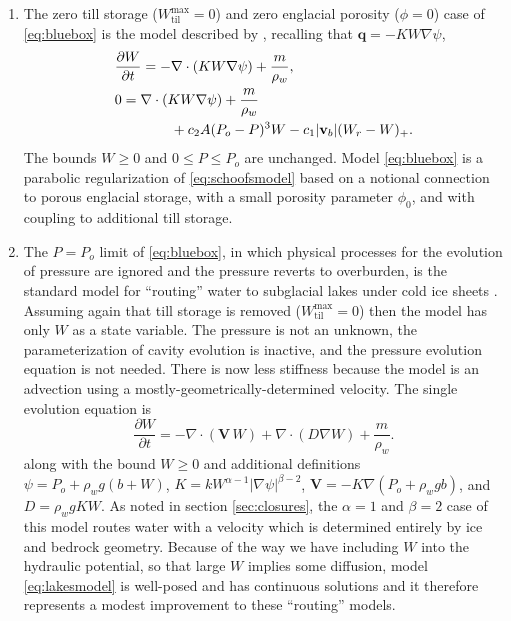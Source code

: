 \documentclass[gmd]{copernicus}   %
\newcommand{\text}{\textrm}
\newcommand\bv{\mathbf{v}}
\newcommand\bV{\mathbf{V}}
\newcommand\bq{\mathbf{q}}
\newcommand{\Div}{\nabla\cdot}
\newcommand{\grad}{\nabla}
\newcommand{\Wtilmax}{W_{\text{til}}^{\text{max}}}
\begin{document}
\renewcommand{\labelenumi}{\textbf{(\roman{enumi})}}
\begin{enumerate}
\item The zero till storage ($\Wtilmax=0$) and zero englacial porosity ($\phi=0$) case of \eqref{eq:bluebox} is the model described by \cite{Schoofetal2012}, recalling that $\bq = - K W \grad \psi$,
\begin{align}
&\frac{\partial W}{\partial t} = - \Div\left( K W \grad \psi \right) + \frac{m}{\rho_w}, \label{eq:schoofsmodel} \\
&0 = \Div \left( K W \grad \psi \right) + \frac{m}{\rho_w} \notag \\
&\qquad \qquad + c_2 A (P_o - P)^3 W - c_1 |\bv_b| (W_r - W)_+.  \notag
\end{align}
The bounds $W \ge 0$ and $0 \le P \le P_o$ are unchanged.  Model \eqref{eq:bluebox} is a parabolic regularization of \eqref{eq:schoofsmodel} based on a notional connection to porous englacial storage, with a small porosity parameter $\phi_0$, and with coupling to additional till storage.

\item The $P=P_o$ limit of \eqref{eq:bluebox}, in which physical processes for the evolution of pressure are ignored and the pressure reverts to overburden, is the standard model for ``routing'' water to subglacial lakes under cold ice sheets \citep{Livingstoneetal2013TCD,Siegertetal2009}.  Assuming again that till storage is removed ($\Wtilmax=0$) then the model has only $W$ as a state variable.  The pressure is not an unknown, the parameterization of cavity evolution is inactive, and the pressure evolution equation is not needed.  There is now less stiffness because the model is an advection using a mostly-geometrically-determined velocity.    The single evolution equation is
\begin{equation}
\frac{\partial W}{\partial t} = - \Div\left(\bV\, W\right) + \Div \left(D \grad W\right) + \frac{m}{\rho_w}. \label{eq:lakesmodel}
\end{equation}
along with the bound $W \ge 0$ and additional definitions $\psi = P_o + \rho_w g (b + W)$, $K = k W^{\alpha-1} \left|\grad \psi\right|^{\beta-2}$, $\bV = - K \grad \left(P_o + \rho_w g b\right)$, and $D = \rho_w g K W$.  As noted in section \ref{sec:closures}, the $\alpha=1$ and $\beta=2$ case of this model routes water with a velocity which is determined entirely by ice and bedrock geometry.  Because of the way we have including $W$ into the hydraulic potential, so that large $W$ implies some diffusion, model \eqref{eq:lakesmodel} is well-posed and has continuous solutions and it therefore represents a modest improvement to these ``routing'' models.


\end{enumerate}
\end{document}
